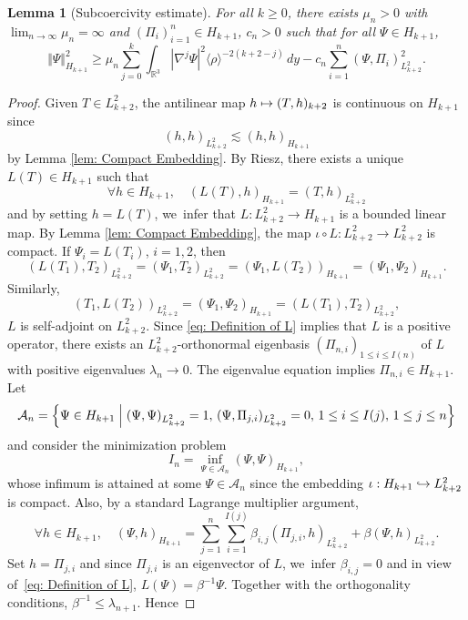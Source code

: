 \documentclass[10pt]{amsart}
\newcommand\mto{\mathchoice{\longmapsto}{\mapsto}{\mapsto}{\mapsto}}
\newcommand\hto{\mathrel{\lhook\joinrel\to}}
\theoremstyle{plain}
\newtheorem{lemma}[proposition]{Lemma}
\theoremstyle{definition}
\begin{document}
\begin{lemma}[Subcoercivity estimate]
\label{lem: Subcoercivity Estimate}
For all $k\ge0$, there exists $\mu_n>0$ with $\lim_{n\to\infty }\mu_n=\infty$ and $(\Pi_i)_{i=1}^{n}\in H_{k+1}$, $c_n>0$ such that for all $\Psi\in H_{k+1}$,
\begin{equation}
\label{eq: Coercivity}
\Vert \Psi\Vert_{H_{k+1}}^2 \ge \mu_n\sum_{j=0}^{k} \int_{\mathbb R^3}|\nabla^j \Psi|^2\langle \rho\rangle ^{-2(k+2-j)}\,dy-c_n\sum_{i=1}^{n}(\Psi,\Pi_i)_{L_{k+2}^2}^2.
\end{equation}
\end{lemma}
\begin{proof}
Given $T\in L_{k+2}^2$, the antilinear map $h\mto (T,h)_{k+2}$ is continuous on $H_{k+1}$ since
\[
(h,h)_{L_{k+2}^2}\lesssim ( h,h)_{H_{k+1}}
\]
by Lemma \ref{lem: Compact Embedding}. By Riesz, there exists a unique $L(T)\in H_{k+1}$ such that
\begin{equation}
\label{eq: Definition of L}
\forall h\in H_{k+1},\quad ( L(T),h)_{H_{k+1}}=(T,h)_{L_{k+2}^2}
\end{equation}
and by setting $h=L(T)$, we~infer that $L: L_{k+2}^2\to H_{k+1}$ is a bounded linear map. By Lemma \ref{lem: Compact Embedding}, the map $\iota\circ L:L_{k+2}^2\to L_{k+2}^2$ is compact. If $\Psi_i=L(T_i)$, $i=1,2$, then
\[
(L(T_1),T_2)_{L_{k+2}^2}=(\Psi_1,T_2)_{L_{k+2}^2}=(\Psi_1,L(T_2))_{H_{k+1}}= ( \Psi_1,\Psi_2 )_{H_{k+1}}.
\]
Similarly,
\[
(T_1,L(T_2))_{L_{k+2}^2}=( \Psi_1,\Psi_2 )_{H_{k+1}}=(L(T_1),T_2)_{L_{k+2}^2},
\]
\ie $L$ is self-adjoint on $L_{k+2}^2$. Since \eqref{eq: Definition of L} implies that $L$ is a positive operator, there exists an $L_{k+2}^2$-orthonormal eigenbasis $(\Pi_{n,i})_{1\le i\le I(n)}$ of $L$ with positive eigenvalues $\lambda_n\to0$. The eigenvalue equation implies $\Pi_{n,i}\in H_{k+1}$. Let
\[
\mathcal A_n=\Big\{\Psi\in H_{k+1} \Bigm| (\Psi,\Psi)_{L_{k+2}^2}=1,\, (\Psi,\Pi_{j,i})_{L_{k+2}^2}=0,\,1\le i\le I(j),\, 1\le j\le n\Big\}
\]
and consider the minimization problem\vspace*{-3pt}
\[
I_n=\inf_{\Psi\in \mathcal A_n}(\Psi,\Psi)_{H_{k+1}},
\]
whose infimum is attained at some $\Psi\in \mathcal A_n$ since the embedding $\iota:H_{k+1}\hto  L_{k+2}^2$ is compact. Also, by a standard Lagrange multiplier argument,\vspace*{-3pt}
\[
\forall h\in H_{k+1},\quad( \Psi,h)_{H_{k+1}}=\sum_{j=1}^n\sum_{i=1}^{I(j)}\beta_{i,j}(\Pi_{j,i},h)_{L_{k+2}^2}+\beta(\Psi,h)_{L_{k+2}^2}.
\]
Set $h=\Pi_{j,i}$ and since $\Pi_{j,i}$ is an eigenvector of $L$, we~infer $\beta_{i,j}=0$ and in view of~\eqref{eq: Definition of L}, $L(\Psi)=\beta^{-1}\Psi$. Together with the orthogonality conditions, $\beta^{-1}\le \lambda_{n+1}$. Hence\vspace*{-3pt}

\end{proof}
\end{document}
